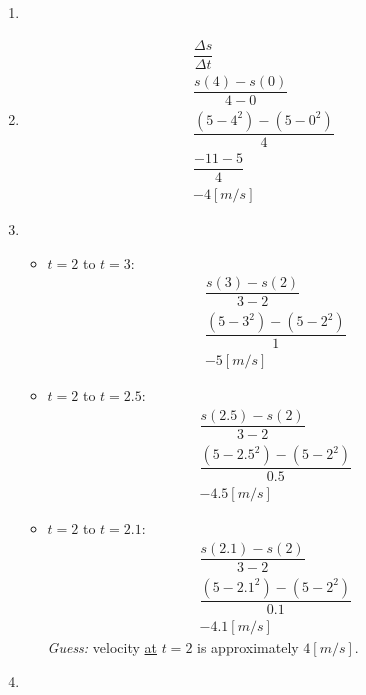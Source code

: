 \begin{enumerate}
    \item \leavevmode\vadjust{\vspace{-\baselineskip}}\newline{}
    \item \begin{gather*}
        \dfrac{\Delta s}{\Delta t} \\
        \dfrac{s(4) - s(0)}{4 - 0} \\
        \dfrac{\left(5 - 4^2 \right) - \left(5 - 0^2\right)}{4} \\
        \dfrac{-11 - 5}{4} \\
        -4 [m/s]
    \end{gather*}
    \item \begin{itemize}
        \item $t = 2$ to $t = 3$:\begin{gather*}
            \dfrac{s(3) - s(2)}{3 - 2} \\
            \dfrac{\left(5 - 3^2\right) - \left(5 - 2^2\right)}{1} \\
            -5 [m/s]
        \end{gather*}
        \item $t = 2$ to $t = 2.5$:\begin{gather*}
            \dfrac{s(2.5) - s(2)}{3 - 2} \\
            \dfrac{\left(5 - 2.5^2\right) - \left(5 - 2^2\right)}{0.5} \\
            -4.5 [m/s]
        \end{gather*}
        \item $t = 2$ to $t = 2.1$:\begin{gather*}
            \dfrac{s(2.1) - s(2)}{3 - 2} \\
            \dfrac{\left(5 - 2.1^2\right) - \left(5 - 2^2\right)}{0.1} \\
            -4.1 [m/s]
        \end{gather*}
        \textit{Guess:} velocity \underline{at} $t = 2$ is approximately $4[m/s]$.
    \end{itemize}
    \item \begin{gather*}

\end{gather*}
\end{enumerate}
